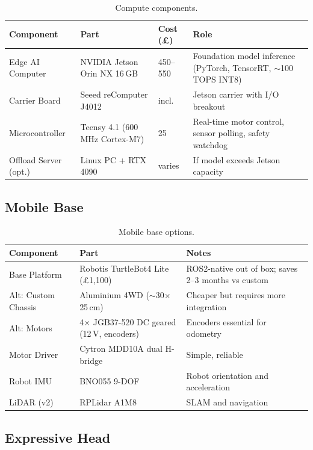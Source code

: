 \documentclass[11pt,a4paper]{article}
\begin{document}
\begin{table}[H]
\centering
\caption{Compute components.}
\label{tab:compute}
\begin{tabularx}{\textwidth}{lllX}
\toprule
\textbf{Component} & \textbf{Part} & \textbf{Cost (£)} & \textbf{Role} \\
\midrule
Edge AI Computer & NVIDIA Jetson Orin NX 16\,GB & 450--550 & Foundation model inference (PyTorch, TensorRT, $\sim$100 TOPS INT8) \\
Carrier Board & Seeed reComputer J4012 & incl. & Jetson carrier with I/O breakout \\
Microcontroller & Teensy 4.1 (600\,MHz Cortex-M7) & 25 & Real-time motor control, sensor polling, safety watchdog \\
Offload Server (opt.) & Linux PC + RTX 4090 & varies & If model exceeds Jetson capacity \\
\bottomrule
\end{tabularx}
\end{table}

\subsection{Mobile Base}

\begin{table}[H]
\centering
\caption{Mobile base options.}
\label{tab:base}
\begin{tabularx}{\textwidth}{llX}
\toprule
\textbf{Component} & \textbf{Part} & \textbf{Notes} \\
\midrule
Base Platform & Robotis TurtleBot4 Lite (£1,100) & ROS2-native out of box; saves 2--3 months vs custom \\
Alt: Custom Chassis & Aluminium 4WD ($\sim$30$\times$25\,cm) & Cheaper but requires more integration \\
Alt: Motors & 4$\times$ JGB37-520 DC geared (12\,V, encoders) & Encoders essential for odometry \\
Motor Driver & Cytron MDD10A dual H-bridge & Simple, reliable \\
Robot IMU & BNO055 9-DOF & Robot orientation and acceleration \\
LiDAR (v2) & RPLidar A1M8 & SLAM and navigation \\
\bottomrule
\end{tabularx}
\end{table}

\subsection{Expressive Head}
\end{document}
